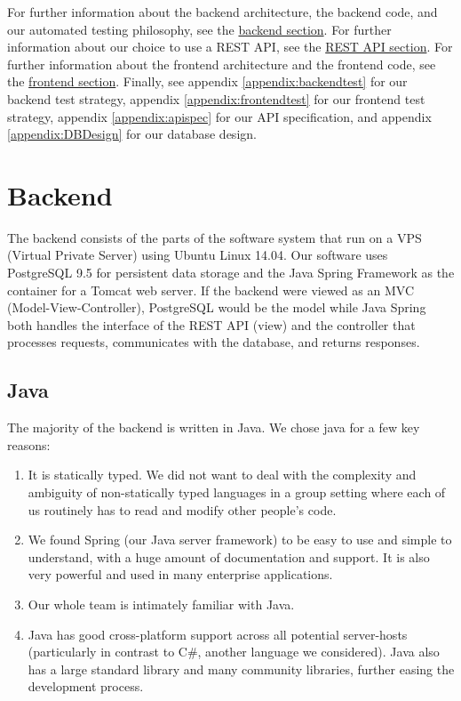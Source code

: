 \documentclass[12pt]{article}
\begin{document}
For further information about the backend architecture, the backend code, and our automated testing philosophy, see the \hyperref[sec:Backend]{backend section}. For further information about our choice to use a REST API, see the \hyperref[sec:REST]{REST API section}. For further information about the frontend architecture and the frontend code, see the \hyperref[sec:Frontend]{frontend section}. Finally, see appendix \ref{appendix:backendtest} for our backend test strategy, appendix \ref{appendix:frontendtest} for our frontend test strategy, appendix \ref{appendix:apispec} for our API specification, and appendix \ref{appendix:DBDesign} for our database design. 



\section{Backend}
\label{sec:Backend}
The backend consists of the parts of the software system that run on a VPS (Virtual Private Server) using Ubuntu Linux 14.04. Our software uses PostgreSQL 9.5 for persistent data storage and the Java Spring Framework as the container for a Tomcat web server. If the backend were viewed as an MVC (Model-View-Controller), PostgreSQL would be the model while Java Spring both handles the interface of the REST API (view) and the controller that processes requests, communicates with the database, and returns responses. 

\subsection{Java}
The majority of the backend is written in Java. We chose java for a few key reasons:
\begin{enumerate}
    \item It is statically typed. We did not want to deal with the complexity and ambiguity of non-statically typed languages in a group setting where each of us routinely has to read and modify other people's code. 
    \item We found Spring (our Java server framework) to be easy to use and simple to understand, with a huge amount of documentation and support. It is also very powerful and used in many enterprise applications. 
    \item Our whole team is intimately familiar with Java. 
    \item Java has good cross-platform support across all potential server-hosts (particularly in contrast to C\#, another language we considered). Java also has a large standard library and many community libraries, further easing the development process. 
\end{enumerate}
\end{document}
